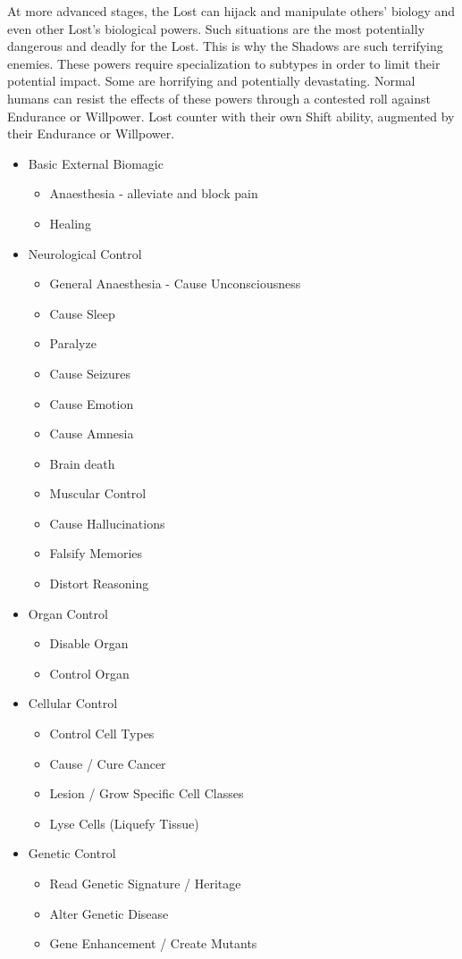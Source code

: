 \documentclass[letterpaper,serif]{rpg-module}
\begin{document}
At more advanced stages, the Lost can hijack and manipulate others' biology and even other Lost's biological powers. 
	Such situations are the most potentially dangerous and deadly for the Lost. 
	This is why the Shadows are such terrifying enemies. 
	These powers require specialization to subtypes in order to limit their potential impact. Some are horrifying and potentially devastating. Normal humans can resist the effects of these powers through a contested roll against Endurance or Willpower. Lost counter with their own Shift ability, augmented by their Endurance or Willpower.   
    \begin{itemize}
	\item Basic External Biomagic
	\begin{itemize}
    	\item Anaesthesia - alleviate and block pain
	    \item Healing
	\end{itemize}
	\item Neurological Control
	\begin{itemize}
    	\item General Anaesthesia - Cause Unconsciousness
	    \item Cause Sleep
	    \item Paralyze
	    \item Cause Seizures
	    \item Cause Emotion 
	    \item Cause Amnesia
	    \item Brain death
	    \item Muscular Control
	    \item Cause Hallucinations
	    \item Falsify Memories
	    \item Distort Reasoning
	\end{itemize}
	\item Organ Control
	\begin{itemize}
	    \item Disable Organ
	    \item Control Organ
	\end{itemize}
	\item Cellular Control 
	\begin{itemize}
	    \item Control Cell Types 
	    \item Cause / Cure Cancer
	    \item Lesion / Grow Specific Cell Classes 
	    \item Lyse Cells (Liquefy Tissue)
	\end{itemize}
    \item Genetic Control 
	\begin{itemize}
	    \item Read Genetic Signature / Heritage
	    \item Alter Genetic Disease
	    \item Gene Enhancement / Create Mutants
	\end{itemize}
	\end{itemize}
\end{document}
